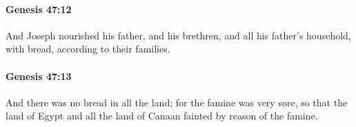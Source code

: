 		\paragraph{Genesis 47:12} %
			\label{GENESIS-47-12}

			And Joseph nourished his father, and his brethren, and all his father's household, with bread, according to their families.


		\paragraph{Genesis 47:13} %
			\label{GENESIS-47-13}

			And there was no bread in all the land; for the famine was very sore, so that the land of Egypt and all the land of Canaan fainted by reason of the famine.


